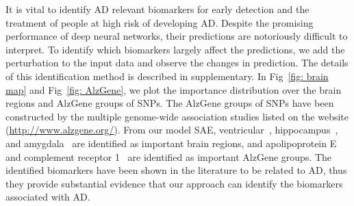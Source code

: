 It is vital to identify AD relevant biomarkers for early detection and the treatment of people at high risk of developing AD. Despite the promising performance of deep neural networks, their predictions are notoriously difficult to interpret. To identify which biomarkers largely affect the predictions, we add the perturbation to the input data and observe the changes in prediction. The details of this identification method is described in supplementary. In Fig~\ref{fig: brain map} and Fig~\ref{fig: AlzGene}, we plot the importance distribution over the brain regions and AlzGene groups of SNPs. The AlzGene groups of SNPs have been constructed by the multiple genome-wide association studies listed on the website (\url{http://www.alzgene.org/}). From our model SAE, ventricular~\cite{carmichael2007ventricular}, hippocampus~\cite{mu2011adult}, and amygdala~\cite{poulin2011amygdala} are identified as important brain regions, and apolipoprotein E~\cite{kim2009role} and complement receptor 1~\cite{lambert2009genome} are identified as important AlzGene groups. The identified biomarkers have been shown in the literature to be related to AD, thus they provide substantial evidence that our approach can identify the biomarkers associated with AD.

